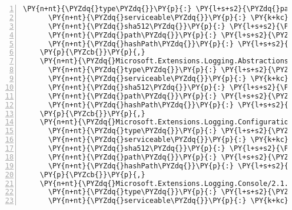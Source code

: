 \begin{Verbatim}[commandchars=\\\{\},numbers=left,firstnumber=1,stepnumber=1,numberblanklines=0]
      \PY{n+nt}{\PYZdq{}type\PYZdq{}}\PY{p}{:} \PY{l+s+s2}{\PYZdq{}package\PYZdq{}}\PY{p}{,}
      \PY{n+nt}{\PYZdq{}serviceable\PYZdq{}}\PY{p}{:} \PY{k+kc}{true}\PY{p}{,}
      \PY{n+nt}{\PYZdq{}sha512\PYZdq{}}\PY{p}{:} \PY{l+s+s2}{\PYZdq{}sha512\PYZhy{}VQ/N/YZl0RiwK1nn0NVBCUW0YMuE55wahNIIsTICgylOB+Kpnl4SYaFaKK7zaX5eHMFVfq3aw5WD1AygBZUr0Q==\PYZdq{}}\PY{p}{,}
      \PY{n+nt}{\PYZdq{}path\PYZdq{}}\PY{p}{:} \PY{l+s+s2}{\PYZdq{}microsoft.extensions.logging/2.1.0\PYZhy{}rc1\PYZhy{}final\PYZdq{}}\PY{p}{,}
      \PY{n+nt}{\PYZdq{}hashPath\PYZdq{}}\PY{p}{:} \PY{l+s+s2}{\PYZdq{}microsoft.extensions.logging.2.1.0\PYZhy{}rc1\PYZhy{}final.nupkg.sha512\PYZdq{}}
    \PY{p}{\PYZcb{}}\PY{p}{,}
    \PY{n+nt}{\PYZdq{}Microsoft.Extensions.Logging.Abstractions/2.1.0\PYZhy{}rc1\PYZhy{}final\PYZdq{}}\PY{p}{:} \PY{p}{\PYZob{}}
      \PY{n+nt}{\PYZdq{}type\PYZdq{}}\PY{p}{:} \PY{l+s+s2}{\PYZdq{}package\PYZdq{}}\PY{p}{,}
      \PY{n+nt}{\PYZdq{}serviceable\PYZdq{}}\PY{p}{:} \PY{k+kc}{true}\PY{p}{,}
      \PY{n+nt}{\PYZdq{}sha512\PYZdq{}}\PY{p}{:} \PY{l+s+s2}{\PYZdq{}sha512\PYZhy{}WaFcqZGC+SlWk3ilJf1GJV7u83SEDsDkCUYbYw9McitgvoZ4DZEKi7QLEKImkRVm7Y5MZKC8gDJ18SxzOhg0KQ==\PYZdq{}}\PY{p}{,}
      \PY{n+nt}{\PYZdq{}path\PYZdq{}}\PY{p}{:} \PY{l+s+s2}{\PYZdq{}microsoft.extensions.logging.abstractions/2.1.0\PYZhy{}rc1\PYZhy{}final\PYZdq{}}\PY{p}{,}
      \PY{n+nt}{\PYZdq{}hashPath\PYZdq{}}\PY{p}{:} \PY{l+s+s2}{\PYZdq{}microsoft.extensions.logging.abstractions.2.1.0\PYZhy{}rc1\PYZhy{}final.nupkg.sha512\PYZdq{}}
    \PY{p}{\PYZcb{}}\PY{p}{,}
    \PY{n+nt}{\PYZdq{}Microsoft.Extensions.Logging.Configuration/2.1.0\PYZhy{}rc1\PYZhy{}final\PYZdq{}}\PY{p}{:} \PY{p}{\PYZob{}}
      \PY{n+nt}{\PYZdq{}type\PYZdq{}}\PY{p}{:} \PY{l+s+s2}{\PYZdq{}package\PYZdq{}}\PY{p}{,}
      \PY{n+nt}{\PYZdq{}serviceable\PYZdq{}}\PY{p}{:} \PY{k+kc}{true}\PY{p}{,}
      \PY{n+nt}{\PYZdq{}sha512\PYZdq{}}\PY{p}{:} \PY{l+s+s2}{\PYZdq{}sha512\PYZhy{}6TKzOdv3n6t4faO25L1i3j7ryJU1CND03JLkmoiKTF55KGWsgtJl7R4bPJ2T6y7au1gpbQfXhVd3j1awDnyl4w==\PYZdq{}}\PY{p}{,}
      \PY{n+nt}{\PYZdq{}path\PYZdq{}}\PY{p}{:} \PY{l+s+s2}{\PYZdq{}microsoft.extensions.logging.configuration/2.1.0\PYZhy{}rc1\PYZhy{}final\PYZdq{}}\PY{p}{,}
      \PY{n+nt}{\PYZdq{}hashPath\PYZdq{}}\PY{p}{:} \PY{l+s+s2}{\PYZdq{}microsoft.extensions.logging.configuration.2.1.0\PYZhy{}rc1\PYZhy{}final.nupkg.sha512\PYZdq{}}
    \PY{p}{\PYZcb{}}\PY{p}{,}
    \PY{n+nt}{\PYZdq{}Microsoft.Extensions.Logging.Console/2.1.0\PYZhy{}rc1\PYZhy{}final\PYZdq{}}\PY{p}{:} \PY{p}{\PYZob{}}
      \PY{n+nt}{\PYZdq{}type\PYZdq{}}\PY{p}{:} \PY{l+s+s2}{\PYZdq{}package\PYZdq{}}\PY{p}{,}
      \PY{n+nt}{\PYZdq{}serviceable\PYZdq{}}\PY{p}{:} \PY{k+kc}{true}\PY{p}{,}

\end{Verbatim}
